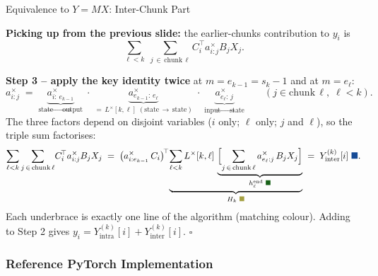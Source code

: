\begin{frame}{Equivalence to $Y = MX$: Inter-Chunk Part}

  \textbf{Picking up from the previous slide:} the earlier-chunks contribution to $y_i$ is
  \[
    \sum_{\ell < k}\;\sum_{j \,\in\, \text{chunk}\,\ell} C_i^{\!\top} a^\times_{i:j} B_j X_j.
  \]

  \vspace{0.3em}
  \textbf{Step 3 -- apply the key identity twice} at $m = e_{k-1} = s_k - 1$ and at $m = e_\ell$:
  \[
    a^\times_{i:j} \;=\; \underbrace{a^\times_{i:\,e_{k-1}}}_{\text{state}\,\to\,\text{output}}
                       \;\cdot\; \underbrace{a^\times_{e_{k-1}:\,e_\ell}}_{=\,L^\times[k,\ell]\;(\text{state}\,\to\,\text{state})}
                       \;\cdot\; \underbrace{a^\times_{e_\ell:\,j}}_{\text{input}\,\to\,\text{state}}
    \qquad (j \in \text{chunk}\,\ell,\;\ell < k).
  \]
  The three factors depend on disjoint variables ($i$ only; $\ell$ only; $j$ and $\ell$), so the triple sum factorises:
  \[
    \sum_{\ell<k}\sum_{j\,\in\,\text{chunk}\,\ell}\! C_i^{\!\top} a^\times_{i:j} B_j X_j
    \;=\; \bigl(a^\times_{i:e_{k-1}}\,C_i\bigr)^{\!\top}\!
          \underbrace{\sum_{\ell<k} L^\times[k,\ell]\,
            \underbrace{\Bigl[\sum_{j\,\in\,\text{chunk}\,\ell} a^\times_{e_\ell:j}\,B_j X_j\Bigr]}_{h_\ell^{\text{end}}\;{\color{mambagreen!70!black}\blacksquare}}
          }_{H_k\;{\color{yellow!60!black}\blacksquare}}
    \;=\; Y_{\text{inter}}^{(k)}[i]\;{\color{mambablue!75!black}\blacksquare}.
  \]
  Each underbrace is exactly one line of the algorithm (matching colour). Adding to Step 2 gives $y_i = Y_{\text{intra}}^{(k)}[i] + Y_{\text{inter}}^{(k)}[i]$. \hfill$\square$

\end{frame}

\subsubsection{Reference PyTorch Implementation}

